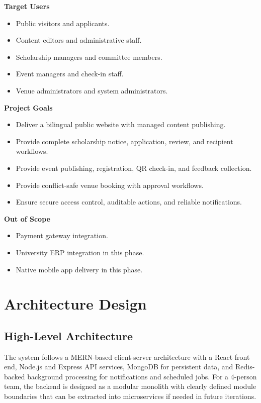 \documentclass[12pt,a4paper]{article}
\begin{document}
\textbf{Target Users}
\begin{itemize}[nosep]
\item Public visitors and applicants.
\item Content editors and administrative staff.
\item Scholarship managers and committee members.
\item Event managers and check-in staff.
\item Venue administrators and system administrators.
\end{itemize}

\textbf{Project Goals}
\begin{itemize}[nosep]
\item Deliver a bilingual public website with managed content publishing.
\item Provide complete scholarship notice, application, review, and recipient workflows.
\item Provide event publishing, registration, QR check-in, and feedback collection.
\item Provide conflict-safe venue booking with approval workflows.
\item Ensure secure access control, auditable actions, and reliable notifications.
\end{itemize}

\textbf{Out of Scope}
\begin{itemize}[nosep]
\item Payment gateway integration.
\item University ERP integration in this phase.
\item Native mobile app delivery in this phase.
\end{itemize}

\section{Architecture Design}

\subsection{High-Level Architecture}
The system follows a MERN-based client-server architecture with a React front end, Node.js and Express API services, MongoDB for persistent data, and Redis-backed background processing for notifications and scheduled jobs. For a 4-person team, the backend is designed as a modular monolith with clearly defined module boundaries that can be extracted into microservices if needed in future iterations.
\end{document}
